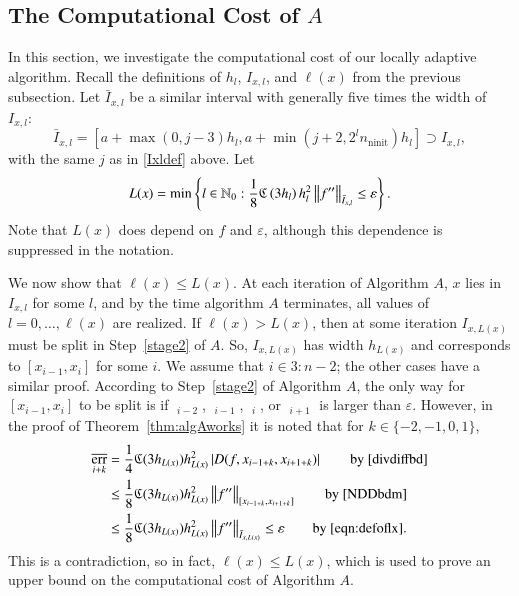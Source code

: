 \documentclass[review]{elsarticle}
\newcommand{\abstol}{\varepsilon}
\theoremstyle{definition}
\newcommand{\Ixl}{I_{x,l}}
\DeclareMathOperator{\ninit}{ninit}
\DeclareMathOperator{\oerr}{\overline{err}}
\begin{document}
\subsection{The Computational Cost of $A$} \label{subsec:appxcost}

In this section, we investigate the computational cost of our locally adaptive
algorithm. Recall the definitions of $h_l$, $\Ixl$, and $\ell(x)$ from the
previous subsection. Let
$\bar{I}_{x,l}$ be a similar interval with generally five times the
width of~$\Ixl$:
\begin{equation}
\bar{I}_{x,l}=\left[a+\max(0,j-3)h_l, a+ \min(j+2,2^l n_{\ninit})h_l\right] \supset \Ixl,
\end{equation}
with the same $j$ as in \eqref{Ixldef} above.  Let
\begin{equation}\label{eqn:defoflx}
L(x) = \min \left\{ l \in \mathbb{N}_0 :  \frac{1}{8} \fC\left(3h_l\right)h_l^2\norm[\bar{I}_{x,l}]{f''} \le \abstol \right\}.
\end{equation}
Note that $L(x)$ does depend on $f$ and $\abstol$, although this dependence is 
suppressed in the notation.

We now show that $\ell(x) \le L(x)$. At each iteration of Algorithm $A$, $x$
lies in $\Ixl$ for some $l$, and by the time algorithm $A$ terminates, all
values of $l = 0, \ldots, \ell(x)$ are realized. If $\ell(x) > L(x)$, then at
some iteration $I_{x,L(x)}$ must be split in Step~\ref{stage2} of $A$. So,
$I_{x,L(x)}$ has width $h_{L(x)}$ and corresponds to $[x_{i-1},x_i]$ for some
$i$. We assume that $i \in 3\!:\!n-2$; the other cases have a similar proof.
According to Step~\ref{stage2} of Algorithm $A$, the only way for
$[x_{i-1},x_i]$ to be split is if $\oerr_{i-2}$, $\oerr_{i-1}$, $\oerr_{i}$, or
$\oerr_{i+1}$ is larger than $\abstol$. However, in the proof of 
Theorem~\ref{thm:algAworks} it is noted that for $k \in \{-2, -1, 0, 1\}$,
\begin{align}
\nonumber
\oerr_{i+k} & = \frac{1}4 \fC(3h_{L(x)}) h_{L(x)}^2 \abs{D(f,x_{i-1+k},x_{i+1+k})} \qquad 
\text{by \eqref{divdiffbd}} \\
\nonumber
& \le \frac{1} 8  \fC(3h_{L(x)}) h_{L(x)}^2\norm[{[x_{i-1+k},x_{i+1+k}]}]{f''}  \qquad 
\text{by \eqref{NDDbdm}}\\
& \le \frac{1} 8  \fC(3h_{L(x)}) h_{L(x)}^2 \norm[\bar{I}_{x,L(x)}]{f''} \le \varepsilon \qquad 
\text{by \eqref{eqn:defoflx}}. \label{oerrbd}
\end{align}
This is a contradiction, so in fact, $\ell(x) \le L(x)$, which is used to prove an upper 
bound on the
computational cost of Algorithm $A$.
\end{document}
